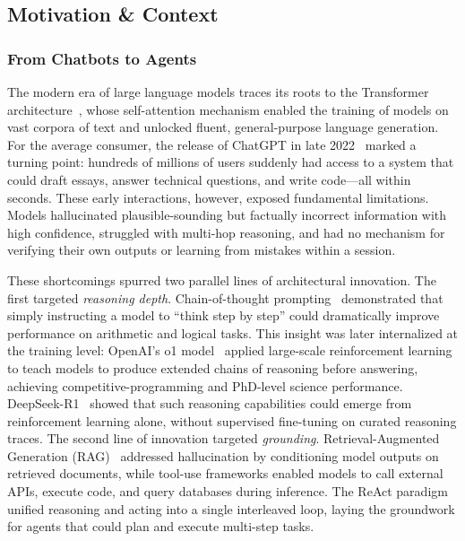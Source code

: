 
\subsection{Motivation \& Context}\label{sec:motivation}

\subsubsection{From Chatbots to Agents}\label{sec:chatbots_to_agents}

The modern era of large language models traces its roots to the Transformer architecture~\citep{vaswani2017attention}, whose self-attention mechanism enabled the training of models on vast corpora of text and unlocked fluent, general-purpose language generation. For the average consumer, the release of ChatGPT in late 2022~\citep{openai2022chatgpt} marked a turning point: hundreds of millions of users suddenly had access to a system that could draft essays, answer technical questions, and write code---all within seconds. These early interactions, however, exposed fundamental limitations. Models hallucinated plausible-sounding but factually incorrect information with high confidence, struggled with multi-hop reasoning, and had no mechanism for verifying their own outputs or learning from mistakes within a session.

These shortcomings spurred two parallel lines of architectural innovation. The first targeted \emph{reasoning depth}. Chain-of-thought prompting~\citep{wei2022cot} demonstrated that simply instructing a model to ``think step by step'' could dramatically improve performance on arithmetic and logical tasks. This insight was later internalized at the training level: OpenAI's o1 model~\citep{openai2024o1} applied large-scale reinforcement learning to teach models to produce extended chains of reasoning before answering, achieving competitive-programming and PhD-level science performance. DeepSeek-R1~\citep{deepseek2025r1} showed that such reasoning capabilities could emerge from reinforcement learning alone, without supervised fine-tuning on curated reasoning traces. The second line of innovation targeted \emph{grounding}. Retrieval-Augmented Generation (RAG)~\citep{lewis2020rag} addressed hallucination by conditioning model outputs on retrieved documents, while tool-use frameworks enabled models to call external APIs, execute code, and query databases during inference. The ReAct paradigm~\citep{yao2022react} unified reasoning and acting into a single interleaved loop, laying the groundwork for agents that could plan and execute multi-step tasks.

